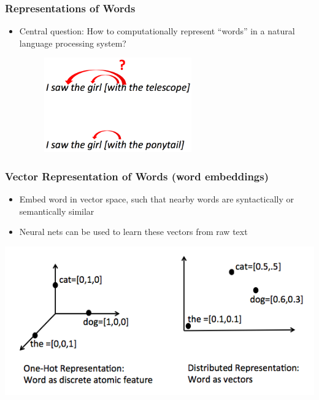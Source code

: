 \documentclass{beamer}
\newcommand{\bi}{\begin{itemize}}
\newcommand{\ei}{\end{itemize}}
\begin{document}
\begin{frame}
\frametitle{Representations of Words}
\bi
\item Central question: How to computationally represent ``words'' in a natural language processing system? 
\begin{figure}[htbp]
\begin{center}
\includegraphics[width=0.6\textwidth]{figs/sentence_ambiguity}
\end{center}
\end{figure}
\ei
\end{frame}


\begin{frame}
\frametitle{Vector Representation of Words (word embeddings)}
\begin{itemize}
\item Embed word in vector space, such that nearby words are syntactically or semantically similar
\item Neural nets can be used to learn these vectors from raw text \cite{collobert11scratch,chen13embedding}
\end{itemize}
\centerline{\includegraphics[scale=0.5]{figs/onehot_vs_embedding}}
\end{frame}
\end{document}
